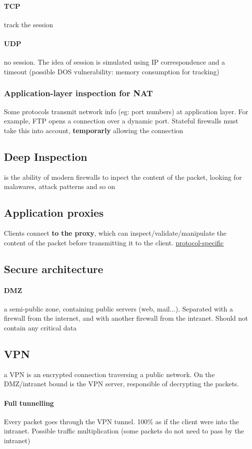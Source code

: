 \documentclass{article}
\begin{document}
\paragraph{TCP} track the session
\paragraph{UDP} no session. The idea of session is simulated using IP correspondence and a timeout (possible DOS vulnerability: memory consumption for tracking)
\subsubsection{Application-layer inspection for NAT} Some protocols transmit network info (eg: port numbers) at application layer. For example, FTP opens a connection over a dynamic port. Stateful firewalls must take this into account, \textbf{temporarly} allowing the connection
\subsection{Deep Inspection} is the ability of modern firewalls to inpect the content of the packet, looking for malawares, attack patterns and so on
\subsection{Application proxies} Clients connect \textbf{to the proxy}, which can inspect/validate/manipulate the content of the packet before transmitting it to the client. \underline{protocol-specific}
\subsection{Secure architecture}
\paragraph{DMZ} a semi-public zone, containing public servers (web, mail...). Separated with a firewall from the internet, and with another firewall from the intranet. Should not contain any critical data
\subsection{VPN} a VPN is an encrypted connection traversing a public network. On the DMZ/intranet bound is the VPN server, responsible of decrypting the packets. 
\paragraph{Full tunnelling} Every packet goes through the VPN tunnel. 100\% as if the client were into the intranet. Possible traffic multiplication (some packets do not need to pass by the intranet)
\end{document}
